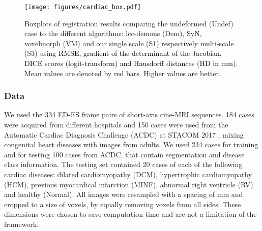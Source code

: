 \documentclass[journal]{IEEEtran}
\newcommand{\update}[1]{\textcolor{black}{#1}}
\begin{document}
\begin{figure*}[tb]
\centering 
\texttt{[image: figures/cardiac\_box.pdf]}
\caption{\small{Boxplots of registration results comparing the undeformed (Undef) case to the different algorithms: lcc-demons (Dem), \update{SyN}, voxelmorph (VM) and our single scale (S1) respectively multi-scale (S3) using \update{RMSE, gradient of the determinant of the Jacobian, DICE scores (logit-transform) and Hausdorff distances (HD in mm)}. Mean values are denoted by red bars. Higher values are better.}}\label{cardiac_metric}
\end{figure*}

\subsubsection{Data} We used the 334 ED-ES frame pairs of short-axis cine-MRI sequences. 184 cases were acquired from different hospitals and 150 cases were used from the Automatic Cardiac Diagnosis Challenge (ACDC) at STACOM 2017 \cite{bernard2018deep}, mixing congenital heart diseases with images from adults. We used 234 cases for training and for testing 100 cases from ACDC, that contain segmentation and disease class information. The testing set contained 20 cases of each of the following cardiac diseases: dilated cardiomyopathy (DCM), hypertrophic cardiomyopathy (HCM), previous myocardical infarction (MINF), abnormal right ventricle (RV) and healthy (Normal). All images were resampled with a spacing of  mm and cropped to a size of  voxels, by equally removing voxels from all sides. These dimensions were chosen to save computation time and are not a limitation of the framework.
\end{document}
